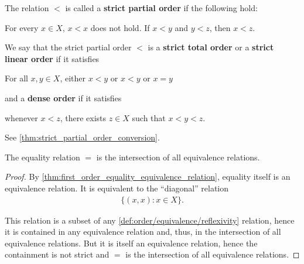 \begin{definition}
\begin{defenum}
    \item\label{def:order/strict_partial}\cite[168]{Enderton1977} The relation \( < \) is called a \textbf{strict partial order} if the following hold:
    \begin{description}
       For every \( x \in X \), \( x < x \) does not hold.
       If \( x < y \) and \( y < z \), then \( x < z \).
    \end{description}

    We say that the strict partial order \( < \) is a \textbf{strict total order} or a \textbf{strict linear order} if it satisfies
    \begin{description}
       For all \( x, y \in X \), either \( x < y \) or \( x < y \) or \( x = y \)
    \end{description}
    and a \textbf{dense order} if it satisfies
    \begin{description}
       whenever \( x < z \), there exists \( z \in X \) such that \( x < y < z \).
    \end{description}

    See \cref{thm:strict_partial_order_conversion}.
  \end{defenum}
\end{definition}

\begin{proposition}\label{thm:equality_is_smallest_equivalence_relation}
  The equality relation \( = \) is the intersection of all equivalence relations.
\end{proposition}
\begin{proof}
  By \cref{thm:first_order_equality_equivalence_relation}, equality itself is an equivalence relation. It is equivalent to the \enquote{diagonal} relation
  \begin{align*}
    \{ (x, x) \colon x \in X \}.
  \end{align*}

  This relation is a subset of any \ref{def:order/equivalence/reflexivity} relation, hence it is contained in any equivalence relation and, thus, in the intersection of all equivalence relations. But it is itself an equivalence relation, hence the containment is not strict and \( = \) is the intersection of all equivalence relations.
\end{proof}

